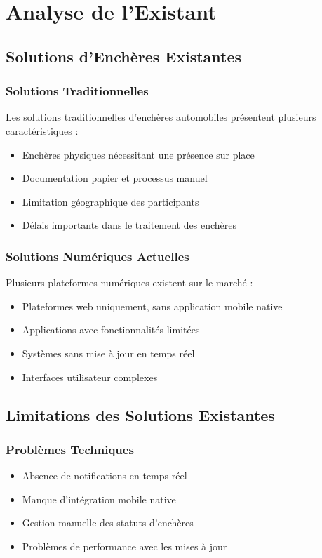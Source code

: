 \chapter{Analyse de l'Existant}

\section{Solutions d'Enchères Existantes}
\subsection{Solutions Traditionnelles}
Les solutions traditionnelles d'enchères automobiles présentent plusieurs caractéristiques :
\begin{itemize}
    \item Enchères physiques nécessitant une présence sur place
    \item Documentation papier et processus manuel
    \item Limitation géographique des participants
    \item Délais importants dans le traitement des enchères
\end{itemize}

\subsection{Solutions Numériques Actuelles}
Plusieurs plateformes numériques existent sur le marché :
\begin{itemize}
    \item Plateformes web uniquement, sans application mobile native
    \item Applications avec fonctionnalités limitées
    \item Systèmes sans mise à jour en temps réel
    \item Interfaces utilisateur complexes
\end{itemize}

\section{Limitations des Solutions Existantes}
\subsection{Problèmes Techniques}
\begin{itemize}
    \item Absence de notifications en temps réel
    \item Manque d'intégration mobile native
    \item Gestion manuelle des statuts d'enchères
    \item Problèmes de performance avec les mises à jour
\end{itemize}

